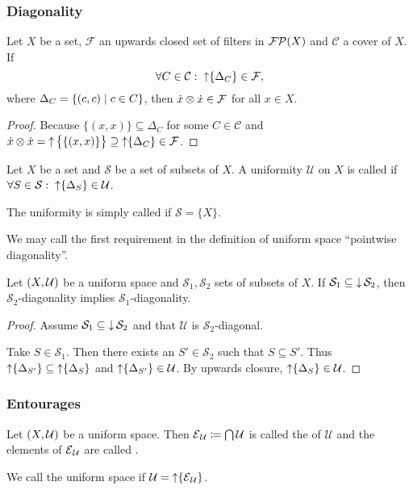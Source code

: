 \subsubsection{Diagonality}
\begin{lemma}
Let $X$ be a set, $\mathcal{F}$ an upwards closed set of filters in $\operatorname{\mathcal{FP}}(X)$ and $\mathcal{C}$ a cover of $X$. If
\[ \forall C\in\mathcal{C}: \; \operatorname{\uparrow}\{\Delta_C\} \in \mathcal{F}, \]
where $\Delta_C = \left\{ (c,c) \;\middle|\; c\in C \right\}$, then $\dot{x}\otimes\dot{x}\in\mathcal{F}$ for all $x\in X$.
\end{lemma}
\begin{proof}
Because $\{(x,x)\}\subseteq \Delta_C$ for some $C\in\mathcal{C}$ and $\dot{x}\otimes\dot{x} = \operatorname{\uparrow} \big\{\{(x,x)\}\big\} \supseteq \operatorname{\uparrow}\{\Delta_C\} \in\mathcal{F}$.
\end{proof}

\begin{definition}
Let $X$ be a set and $\mathcal{S}$ be a set of subsets of $X$. A uniformity $\mathcal{U}$ on $X$ is called  if $\forall S\in\mathcal{S}: \; \operatorname{\uparrow}\{\Delta_S\} \in \mathcal{U}$.

The uniformity is simply called  if $\mathcal{S} = \{X\}$.
\end{definition}
We may call the first requirement in the definition of uniform space ``pointwise diagonality''.

\begin{lemma}
Let $\left( X,\mathcal{U} \right)$ be a uniform space and $\mathcal{S}_1, \mathcal{S}_2$ sets of subsets of $X$. If $\mathcal{S}_1 \subseteq \operatorname{\downarrow} \mathcal{S}_2$, then $\mathcal{S}_2$-diagonality implies $\mathcal{S}_1$-diagonality.
\end{lemma}
\begin{proof}
Assume $\mathcal{S}_1 \subseteq \operatorname{\downarrow} \mathcal{S}_2$ and that $\mathcal{U}$ is $\mathcal{S}_2$-diagonal.

Take $S\in \mathcal{S}_1$. Then there exists an $S'\in \mathcal{S}_2$ such that $S\subseteq S'$. Thus $\operatorname{\uparrow}\{\Delta_{S'}\} \subseteq \operatorname{\uparrow}\{\Delta_{S}\}$ and $\operatorname{\uparrow}\{\Delta_{S'}\}\in \mathcal{U}$. By upwards closure, $\operatorname{\uparrow}\{\Delta_{S}\} \in \mathcal{U}$.
\end{proof}

\subsubsection{Entourages}
\begin{definition}
Let $\left( X, \mathcal{U} \right)$ be a uniform space. Then $\operatorname{\mathcal{E}}_\mathcal{U} \coloneqq \bigcap \mathcal{U}$ is called the  of $\mathcal{U}$ and the elements of $\operatorname{\mathcal{E}}_\mathcal{U}$ are called .

We call the uniform space  if $\mathcal{U} = \operatorname{\uparrow}\{\operatorname{\mathcal{E}}_\mathcal{U}\}$.
\end{definition}

